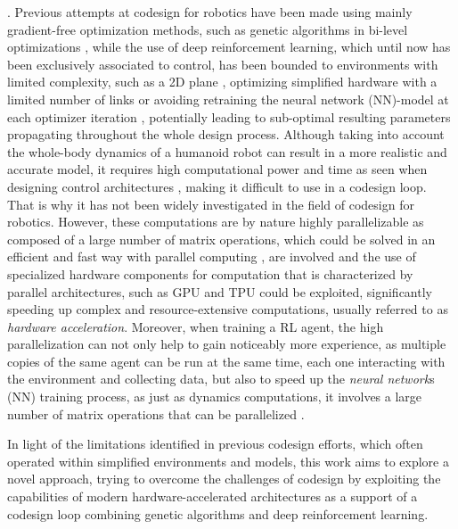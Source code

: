 . Previous attempts at codesign for robotics have been made using mainly gradient-free optimization methods, such as genetic algorithms in bi-level optimizations \citep{sartore_optimization_2022,fadini_simulation_2022}, while the use of deep reinforcement learning, which until now has been exclusively associated to control, has been bounded to environments with limited complexity, such as a 2D plane \citep{ha_reinforcement_2019}, optimizing simplified hardware with a limited number of links \citep{chen_hardware_2020} or avoiding retraining the neural network (\ac{NN})-model at each optimizer iteration \citep{bjelonic_learning-based_2023}, potentially leading to sub-optimal resulting parameters propagating throughout the whole design process. Although taking into account the whole-body dynamics of a humanoid robot can result in a more realistic and accurate model, it requires high computational power and time as seen when designing control architectures \citep{ramuzat_benchmarking_2022}, making it difficult to use in a codesign loop. That is why it has not been widely investigated in the field of codesign for robotics.  However, these computations are by nature highly parallelizable as composed of a large number of matrix operations, which could be solved in an efficient and fast way with parallel computing \citep{gyawali_comparative_2023, tuma_2023}, are involved and the use of specialized hardware components for computation that is characterized by parallel architectures, such as \ac{GPU} and \ac{TPU} could be exploited, significantly speeding up complex and resource-extensive computations, usually referred to as \textit{hardware acceleration}. Moreover, when training a \ac{RL} agent, the high parallelization can not only help to gain noticeably more experience, as multiple copies of the same agent can be run at the same time, each one interacting with the environment and collecting data, but also to speed up the \textit{neural network}s (\ac{NN}) training process, as just as dynamics computations, it involves a large number of matrix operations that can be parallelized \citep{pandey_transformational_2022,gyawali_comparative_2023}.

In light of the limitations identified in previous codesign efforts, which often operated within simplified environments and models, this work aims to explore a novel approach, trying to overcome the challenges of codesign by exploiting the capabilities of modern hardware-accelerated architectures as a support of a codesign loop combining genetic algorithms and deep reinforcement learning.

